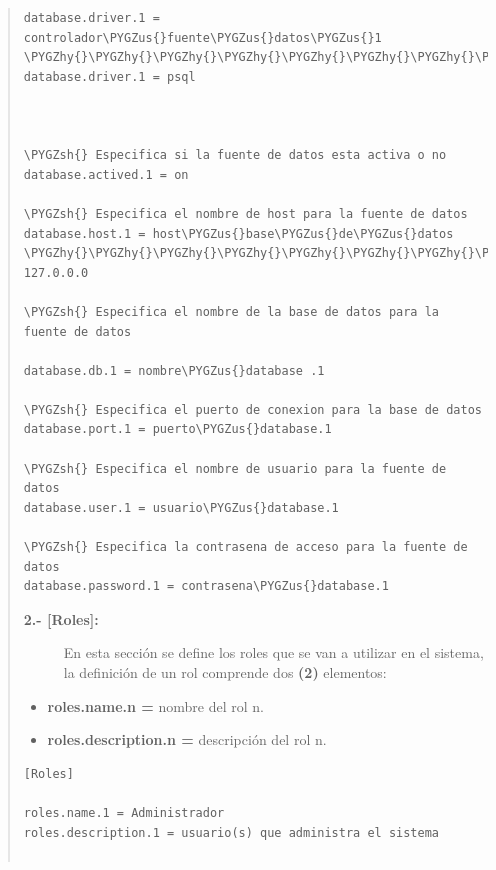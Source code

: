 \documentclass[letterpaper,11pt,spanish]{sphinxmanual}
\def\PYGZus{\char`\_}
\def\PYGZgt{\char`\>}
\def\PYGZsh{\char`\#}
\def\PYGZhy{\char`\-}
\begin{document}
\begin{quote}
\begin{Verbatim}[commandchars=\\\{\}]
database.driver.1 = controlador\PYGZus{}fuente\PYGZus{}datos\PYGZus{}1       \PYGZhy{}\PYGZhy{}\PYGZhy{}\PYGZhy{}\PYGZhy{}\PYGZhy{}\PYGZhy{}\PYGZhy{}\PYGZhy{}\PYGZhy{}\PYGZhy{}\PYGZhy{}\PYGZhy{}\PYGZhy{}\PYGZhy{}\PYGZhy{}\PYGZhy{}\PYGZhy{}\PYGZgt{}Ejemplo:  database.driver.1 = psql



\PYGZsh{} Especifica si la fuente de datos esta activa o no
database.actived.1 = on

\PYGZsh{} Especifica el nombre de host para la fuente de datos
database.host.1 = host\PYGZus{}base\PYGZus{}de\PYGZus{}datos                  \PYGZhy{}\PYGZhy{}\PYGZhy{}\PYGZhy{}\PYGZhy{}\PYGZhy{}\PYGZhy{}\PYGZhy{}\PYGZhy{}\PYGZhy{}\PYGZhy{}\PYGZhy{}\PYGZhy{}\PYGZhy{}\PYGZhy{}\PYGZhy{}\PYGZhy{}\PYGZhy{}\PYGZgt{}Ejemplo: 127.0.0.0

\PYGZsh{} Especifica el nombre de la base de datos para la fuente de datos

database.db.1 = nombre\PYGZus{}database .1

\PYGZsh{} Especifica el puerto de conexion para la base de datos
database.port.1 = puerto\PYGZus{}database.1

\PYGZsh{} Especifica el nombre de usuario para la fuente de datos
database.user.1 = usuario\PYGZus{}database.1

\PYGZsh{} Especifica la contrasena de acceso para la fuente de datos
database.password.1 = contrasena\PYGZus{}database.1
\end{Verbatim}
\begin{description}
\item[{\textbf{2.- {[}Roles{]}:}}] \leavevmode
En esta sección se define los roles que se van a utilizar en el sistema, la definición de un rol comprende dos \textbf{(2)} elementos:

\end{description}
\begin{itemize}
\item {} 
\textbf{roles.name.n =} nombre del rol n.

\item {} 
\textbf{roles.description.n =} descripción del rol n.

\end{itemize}

\begin{Verbatim}[commandchars=\\\{\}]
[Roles]

roles.name.1 = Administrador
roles.description.1 = usuario(s) que administra el sistema


\end{Verbatim}
\end{quote}
\end{document}

